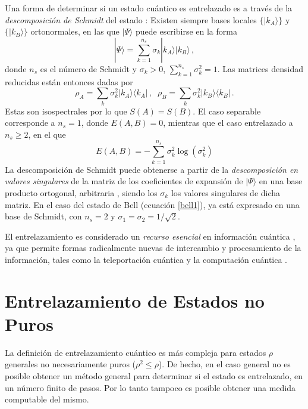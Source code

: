 Una forma de determinar si un estado cuántico es entrelazado es a través de la
{\it descomposición de Schmidt} del estado \cite{NC.00}:
Existen siempre bases locales $\{|k_A\rangle\}$ y $\{|k_B\rangle\}$
ortonormales, en las que $|\Psi\rangle$ puede escribirse en la forma
\begin{equation}|\Psi\rangle=\sum_{k=1}^{n_s} \sigma_k|k_A\rangle|k_B\rangle
\,,\label{SD}
\end{equation}
donde $n_s$ es el número de Schmidt y $\sigma_k>0$,
$\sum_{k=1}^{n_s}\sigma_k^2=1$. Las matrices densidad
reducidas están entonces dadas por
\begin{equation}\rho_A=\sum_{k} \sigma_k^2|k_A\rangle\langle k_A|\,,\;\;
\rho_B=\sum_{k} \sigma_k^2|k_B\rangle\langle k_B|\label{rred}\,.\end{equation}
Estas son isospectrales por lo que $S(A)=S(B)$.
El caso separable corresponde a $n_s=1$,
donde  $E(A,B)=0$, mientras que el caso entrelazado a $n_s\geq 2$, en el que
\begin{equation}E(A,B)=-\sum_{k=1}^{n_s}\sigma_k^2\log (\sigma_k^2)
\label{EAB2}
\end{equation}
La descomposición de Schmidt puede obtenerse a partir de la
{\itshape descomposición en valores singulares} de la matriz de los coeficientes
de expansión de $|\Psi\rangle$ en una base producto ortogonal, arbitraria
\cite{NC.00}, siendo los $\sigma_k$ los valores singulares de dicha matriz.
En el caso del estado de Bell (ecuación \ref{bell1}), ya está
expresado en una base de Schmidt, con $n_s=2$ y
$\sigma_1=\sigma_2=1/\sqrt{2}$. 

El entrelazamiento es considerado un {\it recurso
esencial} en información cuántica \cite{NC.00,V.07}, ya que permite formas
radicalmente nuevas de intercambio y procesamiento de la información,
tales como la teleportación cuántica \cite{t.93} y la computación cuántica \cite{NC.00}. 

\section{Entrelazamiento de Estados no Puros}
La definición de entrelazamiento cuántico es m\'as compleja para estados $\rho$ generales 
no necesariamente puros ($\rho^2\leq\rho$). De hecho, en el caso general no es posible obtener un m\'etodo general 
para determinar si el estado es entrelazado, en un n\'umero finito de pasos. Por lo tanto tampoco es posible
obtener una medida computable del mismo.

